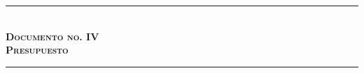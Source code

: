 \documentclass[spanish,a4paper,twoside]{book}
\newcommand{\HRule}{\rule{\linewidth}{1mm}}
\newcommand{\cabezaportadilla}[1]{%
  \cleardoublepage 
  \thispagestyle{empty}
  \vspace*{#1}
  \begin{center}}
\newcommand{\superportadilla}[2]{%
  \cabezaportadilla{5cm}
  \HRule \\
  \Huge \textbf{\textsc{#1}} \\[5mm]%
        \textbf{\textsc{#2}}
  \HRule
  \end{center}
  \newpage}
\begin{document}
\superportadilla{Documento no. IV} {Presupuesto}
\renewcommand{\partname}{}
\renewcommand{\contentsname}{Presupuesto}
\tableofcontents
\newpage
\end{document}

